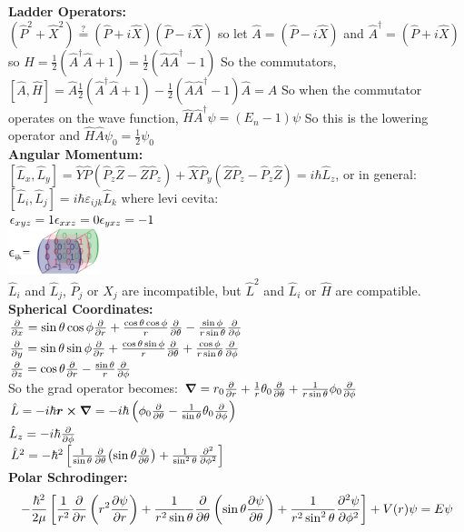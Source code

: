 \documentclass[10pt,landscape,a4paper]{article}
\newcommand{\half}{\frac{1}{2}}
\newcommand{\minititle}[1]{\textbf{#1:}\\}
\renewcommand{\^}[1]{\ensuremath{\hat{#1}}}
\renewcommand{\-}[1]{\text{\sout{\ensuremath{#1}}}}
\begin{document}
\begin{multicols}{4}
	\minititle{Ladder Operators}
	$ (\^P^2+\^X^2 ) \overset{?}{=} (\^P + i\^X)(\^P-i\^X) $ so let $ \^A = (\^P-i\^X) $ and $ \^A^\dagger = (\^P + i\^X) $ so $ \^H = \half(\^A^\dagger\^A+1) = \half(\^A\^A^\dagger-1) $
	So the commutators, $ \left[\^A,\^H\right] = \^A\half(\^A^\dagger\^A + 1) - \half(\^A\^A^\dagger - 1)\^A = \^A $ So when the commutator operates on the wave function, $ \^H\^A^\dagger\psi = (E_n-1)\psi $ So this is the lowering operator and $ \^H\^A\psi_0 = \half\psi_0 $\\
	\minititle{Angular Momentum}
	$ \left[\^L_x,\^L_y\right] = \^Y\^P(\^P_z\^Z-\^Z\^P_z) + \^X\^P_y(\^Z\^P_z - \^P_z\^Z) = i\hbar\^L_z $, or in general: $ \left[\^L_i,\^L_j\right] = i\hbar\varepsilon_{ijk}\^L_k $ where	levi cevita:\\
	$ \epsilon_{xyz} = 1 \\
	\epsilon_{xxz} = 0 \\	
	\epsilon_{yxz} = -1 $\\
	\includegraphics[width=0.2\textwidth]{levicevita.png}\\
	$ \^L_i $ and $ \^L_j $, $ \^P_j $ or $ \^X_j $ are incompatible, but $ \^L^2 $ and $ \^L_i $ or $ \^H $ are compatible.\\ 
	\minititle{Spherical Coordinates}
	$ \frac{\partial}{\partial x} = \sin\theta\cos\phi\frac{\partial}{\partial r} + \frac{\cos\theta\cos\phi}{r} \pdv{\theta} - \frac{\sin\phi}{r\sin\theta}\pdv{\phi} $ \\
	$ \pdv{y} = \sin\theta\sin\phi\pdv{r} + \frac{\cos\theta\sin\phi}{r}\pdv{\theta} + \frac{\cos\phi}{r\sin\theta}\pdv{\phi} $\\
	$ \pdv{z} = \cos\theta\pdv{r} - \frac{\sin\theta}{r}\pdv{\phi} $\\
	So the grad operator becomes: $ \grad = r_0\pdv{r}+\frac{1}{r}\theta_0\pdv{\theta} + \frac{1}{r\sin\theta}\phi_0\pdv{\phi} $\\
	$ \^L = -i\hbar \vb*{r}\cross\grad = -i\hbar\left(\phi_0\pdv{\theta} - \frac{1}{\sin\theta}\theta_0\pdv{\phi}\right) $\\
	$ \^L_z = -i\hbar\pdv{\phi} $ \\
	$ \^L^2 = -\hbar^2\left[\frac{1}{\sin\theta}\pdv{\theta}(\sin\theta\pdv{\theta}) + \frac{1}{\sin^2\theta}\pdv[2]{\phi} \right] $\\
	\minititle{Polar Schrodinger}
	\[ -\frac{\hbar^2}{2\mu}\left[\frac{1}{r^2}\pdv{r}\left(r^2\pdv{\psi}{r}\right) + \frac{1}{r^2\sin\theta}\pdv{\theta}\left(\sin\theta\pdv{\psi}{\theta}\right) + \frac{1}{r^2\sin^2\theta}\pdv[2]{\psi}{\phi} \right] + V(r)\psi = E\psi \]

\end{multicols}
\end{document}
